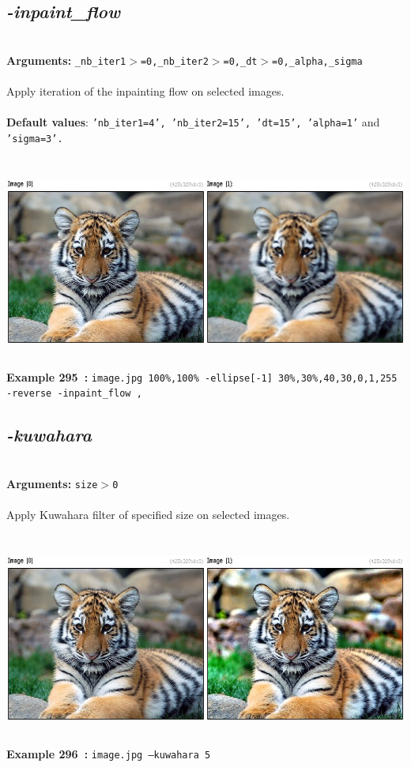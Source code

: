 \documentclass[a4paper,11pt,twoside]{book}
\begin{document}
\subsection{\emph{-inpaint\_flow} }\vspace*{-0.5em}
~\\\textbf{Arguments: } 
{\small \texttt{\_nb\_iter1$>$=0,\_nb\_iter2$>$=0,\_dt$>$=0,\_alpha,\_sigma}}\\~\\
Apply iteration of the inpainting flow on selected images.
~\\~\\\textbf{Default values}: {\small \texttt{'nb\_iter1=4', 'nb\_iter2=15', 'dt=15', 'alpha=1'} and \texttt{'sigma=3'.}}
\begin{center}\includegraphics[keepaspectratio=true,height=7cm,width=\textwidth]{img/gmic_def295.jpg}\\
{\footnotesize \textbf{Example 295~:} \texttt{image.jpg 100\%,100\% -ellipse[-1] 30\%,30\%,40,30,0,1,255 -reverse -inpaint\_flow ,}}
\end{center}

\subsection{\emph{-kuwahara} }\vspace*{-0.5em}
~\\\textbf{Arguments: } 
{\small \texttt{size$>$0}}\\~\\
Apply Kuwahara filter of specified size on selected images.
\begin{center}\includegraphics[keepaspectratio=true,height=7cm,width=\textwidth]{img/gmic_def296.jpg}\\
{\footnotesize \textbf{Example 296~:} \texttt{image.jpg --kuwahara 5}}
\end{center}
\end{document}
